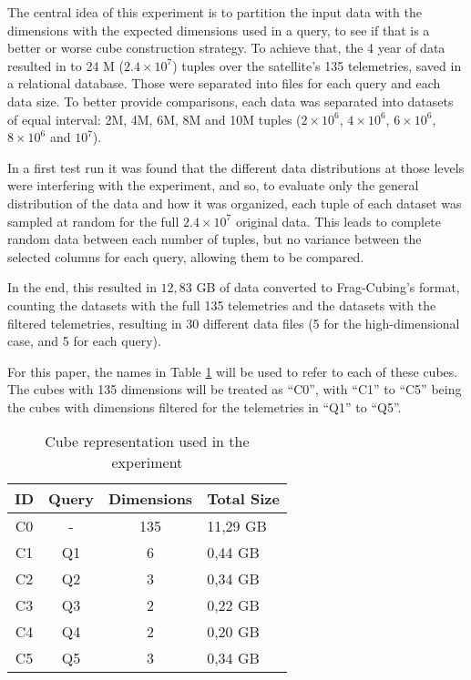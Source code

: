 The central idea of this experiment is to partition the input data with the dimensions with the expected dimensions used in a query, to see if that is a better or worse cube construction strategy.
To achieve that, the 4 year of data resulted in to 24 M (\(\ensuremath{2.4\times 10^{7}}\)) tuples over the satellite's 135 telemetries, saved in a relational database.
Those were separated into files for each query and each data size.
To better provide comparisons, each data was separated into datasets of equal interval: 2M, 4M, 6M, 8M and 10M tuples (\(\ensuremath{2\times 10^{6}}\), \(\ensuremath{4\times 10^{6}}\), \(\ensuremath{6\times 10^{6}}\), \(\ensuremath{8\times 10^{6}}\) and \(\ensuremath{10^{7}}\)).

In a first test run it was found that the different data distributions at those levels were interfering with the experiment, and so, to evaluate only the general distribution of the data and how it was organized, each tuple of each dataset was sampled at random for the full \(\ensuremath{2.4\times 10^{7}}\) original data.
This leads to complete random data between each number of tuples, but no variance between the selected columns for each query, allowing them to be compared.

In the end, this resulted in $12,83$ GB of data converted to Frag-Cubing's format, counting the datasets with the full 135 telemetries and the datasets with the filtered telemetries, resulting in 30 different data files (5 for the high-dimensional case, and 5 for each query).

For this paper, the names in Table \ref{tab:cubenotation} will be used to refer to each of these cubes.
The cubes with 135 dimensions will be treated as ``C0'', with ``C1'' to ``C5'' being the cubes with dimensions filtered for the telemetries in ``Q1'' to ``Q5''.

\begin{table}[H]
\caption{Cube representation used in the experiment}\label{tab:cubenotation}
\centering
\begin{tabular}{cccp{1.5cm}}
\toprule
\bfseries ID &\bfseries Query &\bfseries Dimensions &\bfseries Total Size\\
    \midrule
    C0 & - & 135 & 11,29 GB \\
      C1 & Q1 & 6 & 0,44 GB \\
      C2 & Q2 & 3 & 0,34 GB \\
      C3 & Q3 & 2 & 0,22 GB \\
      C4 & Q4 & 2 & 0,20 GB \\
      C5 & Q5 & 3 & 0,34 GB \\
      \bottomrule
      \end{tabular}
      \end{table}


